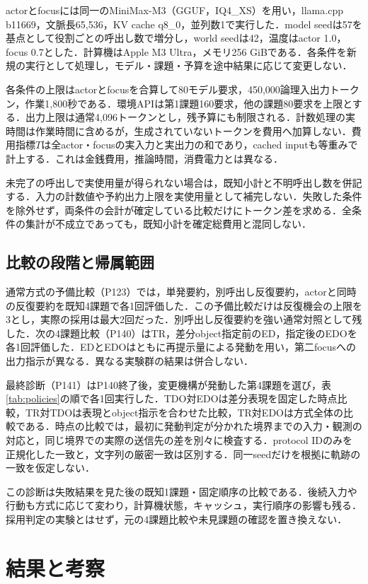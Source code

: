 \documentclass[letter]{ieicej}
\begin{document}
actorとfocusには同一のMiniMax-M3（GGUF，IQ4\_XS）を用い，llama.cpp b11669，文脈長65,536，KV cache q8\_0，並列数1で実行した．model seedは57を基点として役割ごとの呼出し数で増分し，world seedは42，温度はactor 1.0，focus 0.7とした．計算機はApple M3 Ultra，メモリ256 GiBである．各条件を新規の実行として処理し，モデル・課題・予算を途中結果に応じて変更しない．

各条件の上限はactorとfocusを合算して80モデル要求，450,000論理入出力トークン，作業1,800秒である．環境APIは第1課題160要求，他の課題80要求を上限とする．出力上限は通常4,096トークンとし，残予算にも制限される．計数処理の実時間は作業時間に含めるが，生成されていないトークンを費用へ加算しない．費用指標$T$は全actor・focusの実入力と実出力の和であり，cached inputも等重みで計上する．これは金銭費用，推論時間，消費電力とは異なる．

未完了の呼出しで実使用量が得られない場合は，既知小計と不明呼出し数を併記する．入力の計数値や予約出力上限を実使用量として補完しない．失敗した条件を除外せず，両条件の会計が確定している比較だけにトークン差を求める．全条件の集計が不成立であっても，既知小計を確定総費用と混同しない．

\subsection{比較の段階と帰属範囲}
通常方式の予備比較（P123）では，単発要約，別呼出し反復要約，actorと同時の反復要約を既知4課題で各1回評価した．この予備比較だけは反復機会の上限を3とし，実際の採用は最大2回だった．別呼出し反復要約を強い通常対照として残した．次の4課題比較（P140）はTR，差分object指定前のED，指定後のEDOを各1回評価した．EDとEDOはともに再提示量による発動を用い，第二focusへの出力指示が異なる．異なる実験群の結果は併合しない．

最終診断（P141）はP140終了後，変更機構が発動した第4課題を選び，表\ref{tab:policies}の順で各1回実行した．TDO対EDOは差分表現を固定した時点比較，TR対TDOは表現とobject指示を合わせた比較，TR対EDOは方式全体の比較である．時点の比較では，最初に発動判定が分かれた境界までの入力・観測の対応と，同じ境界での実際の送信先の差を別々に検査する．protocol IDのみを正規化した一致と，文字列の厳密一致は区別する．同一seedだけを根拠に軌跡の一致を仮定しない．

この診断は失敗結果を見た後の既知1課題・固定順序の比較である．後続入力や行動も方式に応じて変わり，計算機状態，キャッシュ，実行順序の影響も残る．採用判定の実験とはせず，元の4課題比較や未見課題の確認を置き換えない．

\section{結果と考察}
\end{document}
